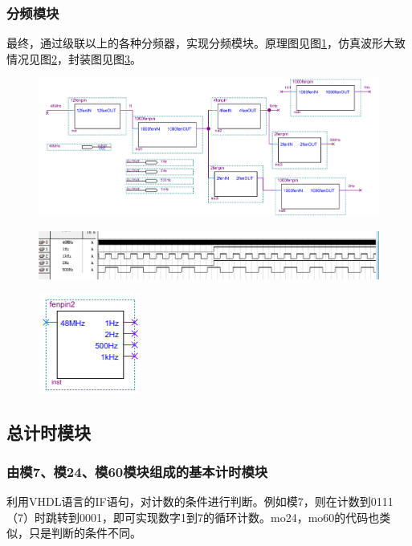 \documentclass[12pt]{article}
\begin{document}
\subsubsection{分频模块}
最终，通过级联以上的各种分频器，实现分频模块。原理图见图\ref{fig:allfenpin}，仿真波形大致情况见图\ref{fig:fangzhenallfenpin}，封装图见图\ref{fig:fengzhuangallfenpin}。
\begin{figure}[hp]
	\centering  
	\includegraphics[width=\textwidth]{picture/fenpin.jpg} 
	\caption{}
	\label{fig:allfenpin}   
\end{figure}
\begin{figure}[hp]
	\centering  
	\includegraphics[width=\textwidth]{picture/TIM20181210184848.png} 
	\caption{}
	\label{fig:fangzhenallfenpin}   
\end{figure}
\begin{figure}[hp]
	\centering  
	\includegraphics[width=0.3\textwidth]{picture/fenzhuangallfenp.png} 
	\caption{}
	\label{fig:fengzhuangallfenpin}   
\end{figure}

\subsection{总计时模块}
\subsubsection{由模7、模24、模60模块组成的基本计时模块}
利用VHDL语言的IF语句，对计数的条件进行判断。例如模7，则在计数到0111（7）时跳转到0001，即可实现数字1到7的循环计数。mo24，mo60的代码也类似，只是判断的条件不同。\par
\end{document}

